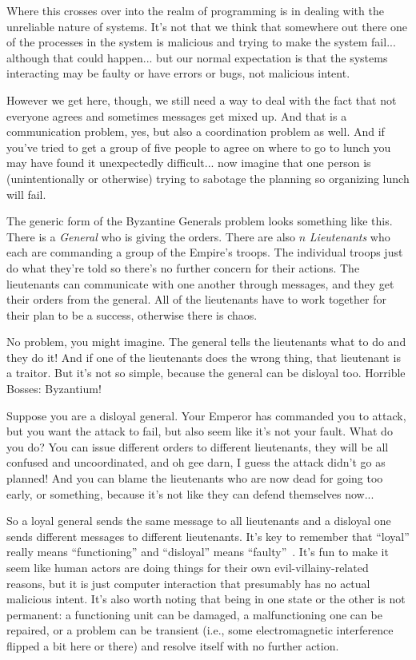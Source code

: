 \documentclass[a4paper]{report}
\begin{document}
Where this crosses over into the realm of programming is in dealing with the unreliable nature of systems. It's not that we think that somewhere out there one of the processes in the system is malicious and trying to make the system fail... although that could happen... but our normal expectation is that the systems interacting may be faulty or have errors or bugs, not malicious intent.

However we get here, though, we still need a way to deal with the fact that not everyone agrees and sometimes messages get mixed up. And that is a communication problem, yes, but also a coordination problem as well. And if you've tried to get a group of five people to agree on where to go to lunch you may have found it unexpectedly difficult... now imagine that one person is (unintentionally or otherwise) trying to sabotage the planning so organizing lunch will fail.

The generic form of the Byzantine Generals problem looks something like this. There is a \textit{General} who is giving the orders. There are also $n$ \textit{Lieutenants} who each are commanding a group of the Empire's troops. The individual troops just do what they're told so there's no further concern for their actions. The lieutenants can communicate with one another through messages, and they get their orders from the general. All of the lieutenants have to work together for their plan to be a success, otherwise there is chaos.

No problem, you might imagine. The general tells the lieutenants what to do and they do it! And if one of the lieutenants does the wrong thing, that lieutenant is a traitor. But it's not so simple, because the general can be disloyal too. Horrible Bosses: Byzantium!

Suppose you are a disloyal general. Your Emperor has commanded you to attack, but you want the attack to fail, but also seem like it's not your fault. What do you do? You can issue different orders to different lieutenants, they will be all confused and uncoordinated, and oh gee darn, I guess the attack didn't go as planned! And you can blame the lieutenants who are now dead for going too early, or something, because it's not like they can defend themselves now...

So a loyal general sends the same message to all lieutenants and a disloyal one sends different messages to different lieutenants. It's key to remember that ``loyal'' really means ``functioning'' and ``disloyal'' means ``faulty''~\cite{mte241}. It's fun to make it seem like human actors are doing things for their own evil-villainy-related reasons, but it is just computer interaction that presumably has no actual malicious intent. It's also worth noting that being in one state or the other is not permanent: a functioning unit can be damaged, a malfunctioning one can be repaired, or a problem can be transient (i.e., some electromagnetic interference flipped a bit here or there) and resolve itself with no further action.
\end{document}
